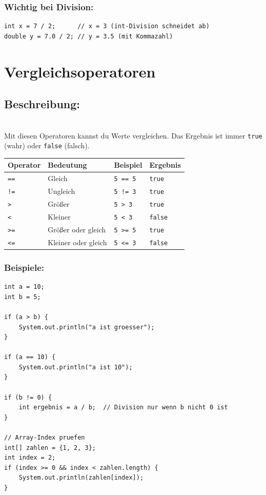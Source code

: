 \subsubsection*{Wichtig bei Division:}
\begin{lstlisting}
int x = 7 / 2;      // x = 3 (int-Division schneidet ab)
double y = 7.0 / 2; // y = 3.5 (mit Kommazahl)
\end{lstlisting}

\newpage


\section*{Vergleichsoperatoren}

\subsection*{Beschreibung:}\\
Mit diesen Operatoren kannst du Werte vergleichen. Das Ergebnis ist immer \texttt{true} (wahr) oder \texttt{false} (falsch).

\begin{center}
	\begin{tabular}{|l|l|l|l|}
		\hline
		\textbf{Operator} & \textbf{Bedeutung} & \textbf{Beispiel} & \textbf{Ergebnis} \\
		\hline
		\texttt{==} & Gleich & \texttt{5 == 5} & \texttt{true} \\
		\hline
		\texttt{!=} & Ungleich & \texttt{5 != 3} & \texttt{true} \\
		\hline
		\texttt{>} & Größer & \texttt{5 > 3} & \texttt{true} \\
		\hline
		\texttt{<} & Kleiner & \texttt{5 < 3} & \texttt{false} \\
		\hline
		\texttt{>=} & Größer oder gleich & \texttt{5 >= 5} & \texttt{true} \\
		\hline
		\texttt{<=} & Kleiner oder gleich & \texttt{5 <= 3} & \texttt{false} \\
		\hline
	\end{tabular}
\end{center}

\subsubsection*{Beispiele:}
\begin{lstlisting}
int a = 10;
int b = 5;

if (a > b) {
    System.out.println("a ist groesser");
}

if (a == 10) {
    System.out.println("a ist 10");
}

if (b != 0) {
    int ergebnis = a / b;  // Division nur wenn b nicht 0 ist
}

// Array-Index pruefen
int[] zahlen = {1, 2, 3};
int index = 2;
if (index >= 0 && index < zahlen.length) {
    System.out.println(zahlen[index]);
}
\end{lstlisting}

